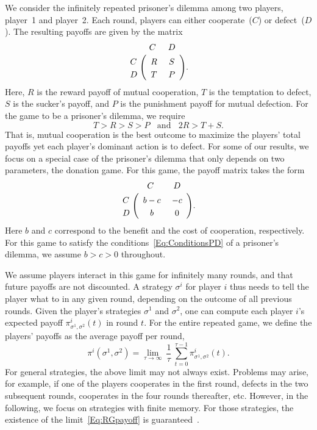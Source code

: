 \documentclass[11pt]{article}
\theoremstyle{definition}
\begin{document}
We consider the infinitely repeated prisoner's dilemma among two players, player~1 and player~2.
Each round, players can either cooperate~($C$) or defect~($D$). 
The resulting payoffs are given by the matrix 
\begin{align}\label{Eq:PrisonerDilemma}
  \bordermatrix{%
    & C & D \cr
    C &\ R &\ S\  \cr
    D &\ T &\ P\ \cr
  }.
\end{align}
Here, $R$ is the reward payoff of mutual cooperation, $T$ is the temptation to defect, $S$ is the sucker's payoff, and $P$ is the punishment payoff for mutual defection. For the game to be a prisoner's dilemma, we require
\begin{equation} \label{Eq:ConditionsPD}
 T > R > S > P ~~~~\text{and}~~~~ 2 R > T \!+\! S. 
\end{equation}
That is, mutual cooperation is the best outcome to maximize the players' total payoffs yet each player's dominant action is to defect. 
For some of our results, we focus on a special case of the prisoner's dilemma that only depends on two parameters, the donation game. 
For this game, the payoff matrix takes the form
\begin{align} \label{Eq:DonationGame}
  \bordermatrix{%
    & C & D \cr
    C &\ b - c &\ -c\  \cr
    D &\ b &\ 0\ \cr
  }.
\end{align}
Here $b$ and $c$ correspond to the benefit and the cost of cooperation, respectively. 
For this game to satisfy the conditions~\eqref{Eq:ConditionsPD} of a prisoner's dilemma, we assume $b\!>\!c\!>\!0$ throughout.

We assume players interact in this game for infinitely many rounds, and that future payoffs are not discounted. 
A strategy $\sigma^i$ for player $i$ thus needs to tell the player what to in any given round, depending on the outcome of all previous rounds. 
Given the player's strategies $\sigma^1$ and $\sigma^2$, one can compute each player $i$'s expected payoff $\pi^i_{\sigma^1,\sigma^2}(t)$ in round $t$. 
For the entire repeated game, we define the players' payoffs as the average payoff per round, 
\begin{equation} \label{Eq:RGpayoff}
\pi^i(\sigma^1,\sigma^2) = \lim_{\tau \to \infty}~ \frac{1}{\tau} ~\sum_{t=0}^{\tau-1} \pi_{\sigma^1,\sigma^2}^i(t).
\end{equation}
For general strategies, the above limit may not always exist. 
Problems may arise, for example, if one of the players cooperates in the first round, defects in the two subsequent rounds, cooperates in the four rounds thereafter, etc. 
However, in the following, we focus on strategies with finite memory. 
For those strategies, the existence of the limit~\eqref{Eq:RGpayoff} is guaranteed~\citep{sigmund2010}. 
\end{document}
